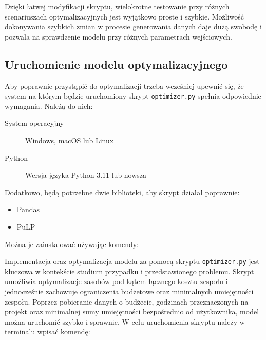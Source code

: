     \par Dzięki łatwej modyfikacji skryptu, wielokrotne testowanie przy różnych scenariuszach optymalizacyjnych jest wyjątkowo proste i szybkie. Możliwość dokonywania szybkich zmian w procesie generowania danych daje dużą swobodę i pozwala na sprawdzenie modelu przy różnych parametrach wejściowych. 
    
        

    \subsection{Uruchomienie modelu optymalizacyjnego}
    \par Aby poprawnie przystąpić do optymalizacji trzeba wcześniej upewnić się, że system na którym będzie uruchomiony skrypt \verb|optimizer.py| spełnia odpowiednie wymagania. Należą do nich:
        \begin{description}
            \item[System operacyjny] Windows, macOS lub Linux
            \item[Python] Wersja języka Python 3.11 lub nowsza 
        \end{description}
        Dodatkowo, będą potrzebne dwie biblioteki, aby skrypt działał poprawnie:
        \begin{itemize}
            \item Pandas
            \item PuLP
        \end{itemize}
    Można je zainstalować używając komendy:
    

    \par Implementacja oraz optymalizacja modelu za pomocą skryptu \verb|optimizer.py| jest kluczowa w kontekście studium przypadku i przedstawionego problemu. Skrypt umożliwia optymalizacje zasobów pod kątem łącznego kosztu zespołu i jednocześnie zachowuje ograniczenia budżetowe oraz minimalnych umiejętności zespołu. Poprzez pobieranie danych o budżecie, godzinach przeznaczonych na projekt oraz minimalnej sumy umiejętności bezpośrednio od użytkownika, model można uruchomić szybko i sprawnie. W celu uruchomienia skryptu należy w terminalu wpisać komendę:
    
    

